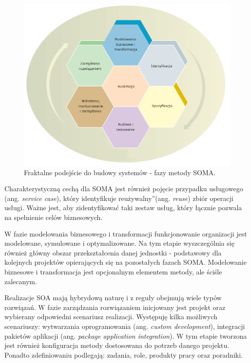 \begin{figure}[h!tbp]
\begin{centering}
\includegraphics[width=14cm]{img/soma_fractal_lifecycle.png}
\caption[Fraktalne podejście do budowy systemów - fazy metody SOMA.]{Fraktalne podejście do budowy systemów - fazy metody SOMA. \cite{SOMAArsIBMJour}}\label{soma_fractal_lifecycle}
\end{centering}
\end{figure}

Charakterystyczną cechą dla SOMA jest również pojęcie przypadku usługowego (ang. \textit{service case}), który identyfikuje \quotedblbase reużywalny\textquotedblright (ang. \textit{reuse}) zbiór operacji usługi. Ważne jest, aby zidentyfikować taki zestaw usług, który łącznie pozwala na spełnienie celów biznesowych. \cite{PlatIntGor}

W fazie modelowania biznesowego i transformacji funkcjonowanie organizacji jest modelowane, symulowane i optymalizowane. Na tym etapie wyszczególnia się również główny obszar przekształcenia danej jednostki - podstawowy dla kolejnych projektów opierających się na pozostałych fazach SOMA. Modelowanie biznesowe i transformacja jest opcjonalnym elementem metody, ale ściśle zalecanym. 

Realizacje SOA mają hybrydową naturę i z reguły obejmują wiele typów rozwiązań. W fazie zarządzania rozwiązaniem inicjowany jest projekt oraz wybierany odpowiedni scenariusz realizacji. Występuję kilka możliwych scenariuszy: wytwarzania oprogramowania (ang. \textit{custom development}), integracji pakietów aplikacji (ang. \textit{package application integration}). W tym etapie tworzona jest również konfiguracja metody dostosowana do potrzeb danego projektu. Ponadto zdefiniowaniu podlegają: zadania, role, produkty pracy oraz poradniki. \cite{SOMAArsIBMJour}


